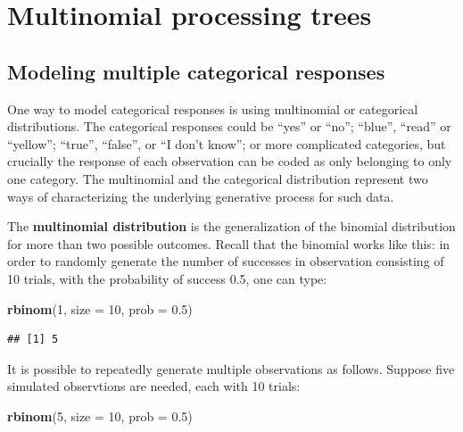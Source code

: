 \documentclass[12pt,]{krantz}
\newenvironment{Shaded}{\begin{snugshade}}{\end{snugshade}}
\newcommand{\KeywordTok}[1]{\textcolor[rgb]{0.13,0.29,0.53}{\textbf{#1}}}
\newcommand{\DataTypeTok}[1]{\textcolor[rgb]{0.13,0.29,0.53}{#1}}
\newcommand{\DecValTok}[1]{\textcolor[rgb]{0.00,0.00,0.81}{#1}}
\newcommand{\FloatTok}[1]{\textcolor[rgb]{0.00,0.00,0.81}{#1}}
\newcommand{\NormalTok}[1]{#1}
\theoremstyle{definition}
\theoremstyle{definition}
\theoremstyle{definition}
\theoremstyle{remark}
\begin{document}
\chapter{Multinomial processing trees}\label{ch:MPT}

\section{Modeling multiple categorical
responses}\label{modeling-multiple-categorical-responses}

One way to model categorical responses is using multinomial or
categorical distributions. The categorical responses could be ``yes'' or
``no''; ``blue'', ``read'' or ``yellow''; ``true'', ``false'', or ``I
don't know''; or more complicated categories, but crucially the response
of each observation can be coded as only belonging to only one category.
The multinomial and the categorical distribution represent two ways of
characterizing the underlying generative process for such data.

The \textbf{multinomial distribution} is the generalization of the
binomial distribution for more than two possible outcomes. Recall that
the binomial works like this: in order to randomly generate the number
of successes in observation consisting of 10 trials, with the
probability of success 0.5, one can type:

\begin{Shaded}
\begin{Highlighting}[]
\KeywordTok{rbinom}\NormalTok{(}\DecValTok{1}\NormalTok{, }\DataTypeTok{size =} \DecValTok{10}\NormalTok{, }\DataTypeTok{prob =} \FloatTok{0.5}\NormalTok{)}
\end{Highlighting}
\end{Shaded}

\begin{verbatim}
## [1] 5
\end{verbatim}

It is possible to repeatedly generate multiple observations as follows.
Suppose five simulated observtions are needed, each with 10 trials:

\begin{Shaded}
\begin{Highlighting}[]
\KeywordTok{rbinom}\NormalTok{(}\DecValTok{5}\NormalTok{, }\DataTypeTok{size =} \DecValTok{10}\NormalTok{, }\DataTypeTok{prob =} \FloatTok{0.5}\NormalTok{)}
\end{Highlighting}
\end{Shaded}
\end{document}
